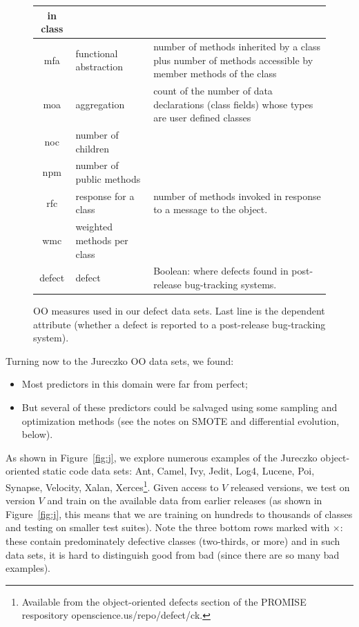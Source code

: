\documentclass[conference]{IEEEtran}
\newcommand{\bi}{\begin{itemize}}
\newcommand{\ei}{\end{itemize}}
\newcommand{\fig}[1]{Figure~\ref{fig:#1}}
\begin{document}
\begin{figure}[htbp!]
\begin{center}
{\begin{tabular}{c|l|p{4.7in}}
        in class\\\hline
        mfa & functional abstraction & number of methods inherited by a class
        plus number of methods accessible by member methods of the
        class\\\hline
        moa &  aggregation &  count of the number of data declarations (class
        fields) whose types are user defined classes\\\hline
        noc &  number of children &\\\hline
        npm & number of public methods & \\\hline
        rfc & response for a class &number of  methods invoked in response to
        a message to the object.\\\hline
        wmc & weighted methods per class &\\\hline
        \rowcolor{lightgray}
        defect & defect & Boolean: where defects found in post-release bug-tracking systems.
      \end{tabular}
    }
  \end{center}
  \caption{OO measures used in our defect data sets.  Last line is
    the dependent attribute (whether a defect is reported to  a
    post-release bug-tracking system).}\label{fig:ck}
\end{figure}

Turning now to the Jureczko   OO data sets, we found:
\bi
\item
Most   predictors in this domain were far from      perfect;
\item 
But several of these predictors could
be salvaged using some sampling and optimization methods (see the notes on SMOTE and differential evolution, below).
\ei
As shown in \fig{j}, we   explore numerous examples of the Jureczko   object-oriented static code data sets: Ant, Camel, Ivy, Jedit,   Log4, Lucene, Poi, Synapse, Velocity, Xalan, Xerces\footnote{Available from the object-oriented defects section of the PROMISE respository openscience.us/repo/defect/ck.}. 
Given access to $V$ released
versions, we test on version $V$ and train on the available data from earlier releases (as
shown in \fig{j}, this means that we are training on hundreds to thousands
of classes and testing on smaller test suites).
Note the three bottom rows marked with $\times$: these contain predominately
defective classes (two-thirds, or more) and in such data sets, it is hard to distinguish
good from bad (since there are so many bad examples). 
\end{document}
